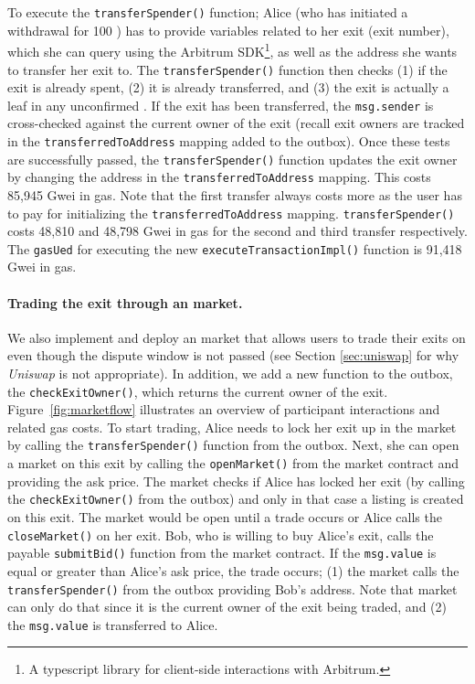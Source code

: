 To execute the \texttt{transferSpender()} function; Alice (who has initiated a withdrawal for 100 \ethtwo) has to provide variables related to her exit (\eg exit number), which she can query using the Arbitrum SDK\footnote{A typescript library for client-side interactions with Arbitrum.}, as well as the \layerone address she wants to transfer her exit to. The \texttt{transferSpender()} function then checks (1) if the exit is already spent, (2) it is already transferred, and (3) the exit is actually a leaf in any unconfirmed \rblock. If the exit has been transferred, the \texttt{msg.sender} is cross-checked against the current owner of the exit (recall exit owners are tracked in the \texttt{transferredToAddress} mapping added to the outbox). Once these tests are successfully passed, the \texttt{transferSpender()} function updates the exit owner by changing the address in the \texttt{transferredToAddress} mapping. This costs  85,945 Gwei in \layerone gas. Note that the first transfer always costs more as the user has to pay for initializing the \texttt{transferredToAddress} mapping. \texttt{transferSpender()} costs 48,810 and 48,798 Gwei in \layerone gas for the second and third transfer respectively. The \texttt{gasUed} for executing the new \texttt{executeTransactionImpl()} function is 91,418 Gwei in \layerone gas.


\paragraph{Trading the exit through an \layerone market.} We also implement and deploy an \layerone market that allows users to trade their exits on \layerone even though the dispute window is not passed (see Section \ref{sec:uniswap} for why \textit{Uniswap} is not appropriate). In addition, we add a new function to the \arb \nitro outbox, the \texttt{checkExitOwner()}, which returns the current owner of the exit. Figure~\ref{fig:marketflow} illustrates an overview of participant interactions and related gas costs. To start trading, Alice needs to lock her exit up in the market by calling the \texttt{transferSpender()} function from the outbox. Next, she can open a market on this exit by calling the \texttt{openMarket()} from the market contract and providing the ask price. The market checks if Alice has locked her exit (by calling the \texttt{checkExitOwner()} from the outbox) and only in that case a listing is created on this exit. The market would be open until a trade occurs or Alice calls the \texttt{closeMarket()} on her exit. Bob, who is willing to buy Alice's exit, calls the payable \texttt{submitBid()} function from the market contract. If the \texttt{msg.value} is equal or greater than Alice's ask price, the trade occurs; (1) the market calls the \texttt{transferSpender()} from the outbox providing Bob's address. Note that market can only do that since it is the current owner of the exit being traded, and (2) the \texttt{msg.value} is transferred to Alice.

